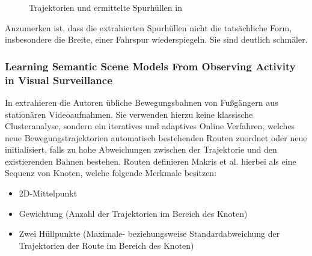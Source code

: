\begin{figure}[H]
    \centering
    \caption[Spurhüllen in Hu et al.]{Trajektorien und ermittelte Spurhüllen in \cite[]{WeimingHu2006}}
    \label{fig:relw_hu_example_envelope}
\end{figure}

Anzumerken ist, dass die extrahierten Spurhüllen nicht die tatsächliche Form, insbesondere die Breite, einer Fahrspur
wiederspiegeln. Sie sind deutlich schmäler.


\subsubsection*{Learning Semantic Scene Models From Observing Activity in Visual Surveillance}
In \cite[]{Makris2005} extrahieren die Autoren übliche Bewegungsbahnen von Fußgängern aus stationären Videoaufnahmen.
Sie verwenden hierzu keine klassische Clusteranalyse, sondern ein iteratives und adaptives Online Verfahren,
welches neue Bewegungstrajektorien automatisch bestehenden Routen zuordnet oder neue initialisiert,
falls zu hohe Abweichungen zwischen der Trajektorie und den existierenden Bahnen bestehen.
Routen definieren Makris et al. hierbei als eine Sequenz von Knoten, welche folgende Merkmale besitzen:

\begin{itemize}
    \item 2D-Mittelpunkt
    \item Gewichtung (Anzahl der Trajektorien im Bereich des Knoten)
    \item Zwei Hüllpunkte (Maximale- beziehungsweise Standardabweichung der Trajektorien der Route im Bereich des Knoten)
\end{itemize}


